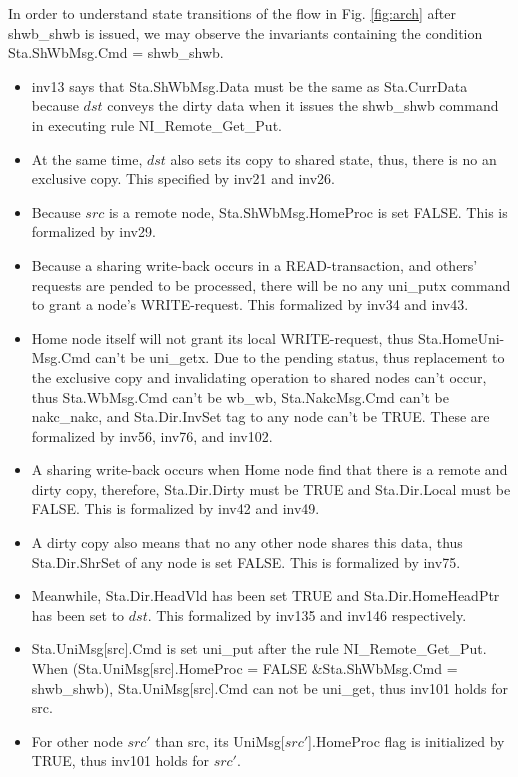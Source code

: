 \documentclass{llncs-new}
\begin{document}
In order to understand state transitions of the flow in Fig. \ref{fig:arch} after shwb\_shwb is issued, we may observe the invariants containing the condition Sta.ShWbMsg.Cmd = shwb\_shwb.

\vspace{-10pt}

\begin{itemize}
\item inv13 says that Sta.ShWbMsg.Data must be the same as Sta.CurrData because $dst$ conveys the dirty data when it issues the  shwb\_shwb command in executing rule NI\_Remote\_Get\_Put.
\item At the same time, $dst$ also sets its copy to shared state, thus, there is no an exclusive copy. This specified by inv21 and inv26.
\item Because   $src$ is a remote node, Sta.ShWbMsg.HomeProc is set FALSE. This is formalized by inv29.
\item Because  a sharing write-back occurs in a READ-transaction, and others' requests are pended to be processed, there will be no any uni\_putx command  to grant a node's WRITE-request. This formalized by inv34 and inv43.
\item Home node itself will not grant its local WRITE-request, thus Sta.HomeUni-Msg.Cmd  can't be  uni\_getx. Due to the pending status, thus replacement to the exclusive copy and invalidating operation to shared nodes can't occur, thus Sta.WbMsg.Cmd can't be wb\_wb, Sta.NakcMsg.Cmd can't be nakc\_nakc, and Sta.Dir.InvSet tag to any node can't be TRUE. These are formalized by inv56, inv76, and inv102.
\item A sharing write-back occurs when Home node find that there is a remote and dirty copy, therefore, Sta.Dir.Dirty must be TRUE and Sta.Dir.Local must be FALSE. This is formalized by inv42 and inv49.
\item A dirty copy also means that no any other node shares this data, thus Sta.Dir.ShrSet of any node is set FALSE. This is formalized by inv75.
\item Meanwhile, Sta.Dir.HeadVld has been set TRUE and Sta.Dir.HomeHeadPtr has been set to $dst$. This formalized by inv135 and inv146 respectively.
\item Sta.UniMsg[src].Cmd  is set uni\_put after the rule NI\_Remote\_Get\_Put. When (Sta.UniMsg[src].HomeProc = FALSE \&Sta.ShWbMsg.Cmd = shwb\_shwb), Sta.UniMsg[src].Cmd can not be uni\_get, thus inv101 holds for src.
\item For other node $src'$ than src, its UniMsg[$src'$].HomeProc flag is initialized by TRUE,  thus inv101 holds for $src'$.
\end{itemize}
\end{document}
